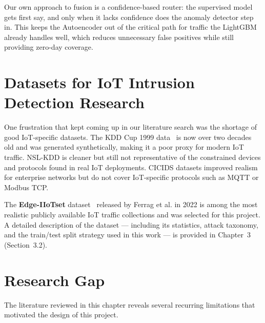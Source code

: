 \documentclass[12pt,a4paper]{report}
\begin{document}
\noindent Our own approach to fusion is a confidence-based router: the supervised
model gets first say, and only when it lacks confidence does the anomaly detector
step in. This keeps the Autoencoder out of the critical path for traffic the LightGBM
already handles well, which reduces unnecessary false positives while still providing
zero-day coverage.

\section{Datasets for IoT Intrusion Detection Research}

One frustration that kept coming up in our literature search was the shortage of
good IoT-specific datasets. The KDD Cup 1999 data~\cite{kdd_cup} is now over two
decades old and was generated synthetically, making it a poor proxy for modern IoT
traffic. NSL-KDD is cleaner but still not representative of the constrained devices
and protocols found in real IoT deployments. CICIDS datasets improved realism for
enterprise networks but do not cover IoT-specific protocols such as MQTT or
Modbus TCP.

\noindent The \textbf{Edge-IIoTset} dataset~\cite{dataset_edge_iiotset} released by
Ferrag et al. in 2022 is among the most realistic publicly available IoT traffic
collections and was selected for this project. A detailed description of the dataset
— including its statistics, attack taxonomy, and the train/test split strategy used
in this work — is provided in Chapter~3 (Section~3.2).

\section{Research Gap}

The literature reviewed in this chapter reveals several recurring limitations that
motivated the design of this project.
\end{document}
